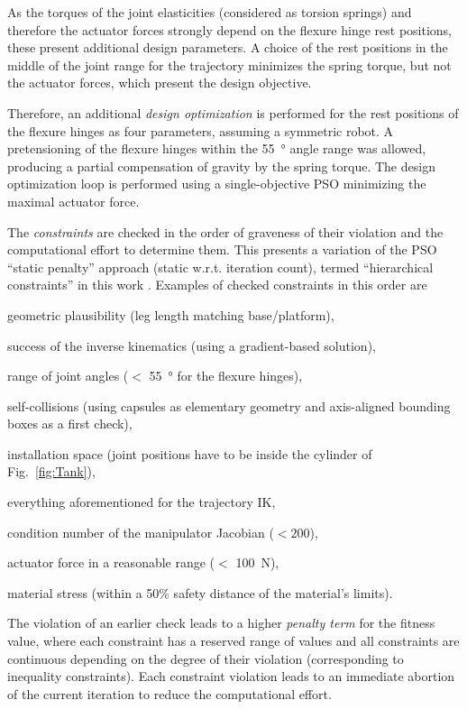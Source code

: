 \documentclass{svproc}
\begin{document}
As the torques of the joint elasticities (considered as torsion springs) and therefore the actuator forces strongly depend on the flexure hinge rest positions, these present additional design parameters.
A choice of the rest positions in the middle of the joint range for the trajectory minimizes the spring torque, but not the actuator forces, which present the design objective.

Therefore, an additional \emph{design optimization} is performed for the rest positions of the flexure hinges as four parameters, assuming a symmetric robot.
A pretensioning of the flexure hinges within the \SI{55}{\degree} angle range was allowed, producing a partial compensation of gravity by the spring torque.
The design optimization loop is performed using a single-objective PSO minimizing the maximal actuator force.

The \emph{constraints} are checked in the order of graveness of their violation and the computational effort to determine them.
This presents a variation of the PSO ``static penalty'' approach \cite{Mezura-MontesCoe2011} (static w.r.t. iteration count), termed ``hierarchical constraints'' in this work \cite{SchapplerOrt2020}.
Examples of checked constraints in this order are
\begin{compactitem}
\item geometric plausibility (leg length matching base/platform), 
\item success of the inverse kinematics (using a gradient-based solution), 
\item range of joint angles ($<$ \SI{55}{\degree} for the flexure hinges), 
\item self-collisions (using capsules as elementary geometry and axis-aligned bounding boxes as a first check), 
\item installation space (joint positions have to be inside the cylinder of Fig.~\ref{fig:Tank}),
\item everything aforementioned for the trajectory IK,
\item condition number of the manipulator Jacobian ($<200$), 
\item actuator force in a reasonable range ($<$ \SI{100}{\newton}),
\item material stress (within a 50\% safety distance of the material's limits).
\end{compactitem}
The violation of an earlier check leads to a higher \emph{penalty term} for the fitness value, where each constraint has a reserved range of values and all constraints are continuous depending on the degree of their violation (corresponding to inequality constraints). 
Each constraint violation leads to an immediate abortion of the current iteration to reduce the computational effort. %
\end{document}
